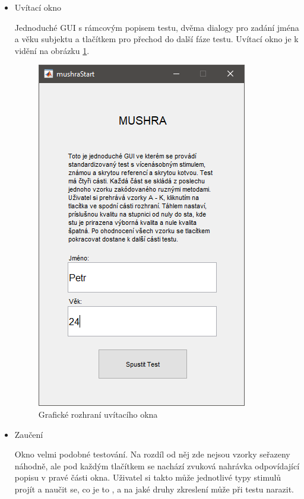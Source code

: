 \begin{itemize}
    \item Uvítací okno
    
    Jednoduché GUI s rámcovým popisem testu, dvěma dialogy pro zadání jména a věku subjektu a tlačítkem pro přechod do další fáze testu. Uvítací okno je k vidění na obrázku \ref{pic:intro}.
    
    \begin{figure}[h]
        \centering
        \includegraphics[width=.32\textwidth]{pic/intro.png}
        \caption{Grafické rozhraní uvítacího okna}
        \label{pic:intro}
        \end{figure}
        
        \item Zaučení
        
        Okno velmi podobné  testování. Na rozdíl od něj zde nejsou vzorky seřazeny náhodně, ale pod každým tlačítkem se nachází zvuková nahrávka odpovídající popisu v pravé části okna. Uživatel si takto může jednotlivé typy stimulů projít a naučit se, co je to ,  a na jaké druhy zkreslení může při testu narazit.

\end{itemize}
